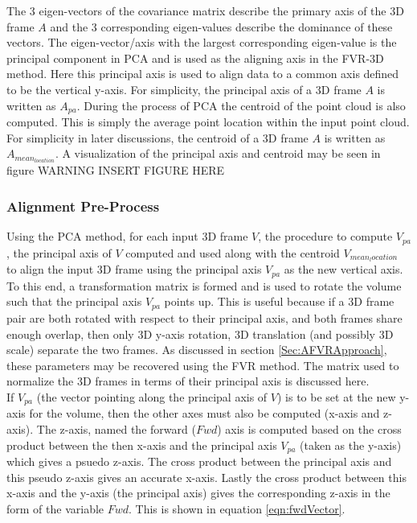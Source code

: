 The 3 eigen-vectors of the covariance matrix describe the primary axis of the 3D frame $A$ and the 3 corresponding eigen-values describe the dominance of these vectors. The eigen-vector/axis with the largest corresponding eigen-value is the principal component in PCA and is used as the aligning axis in the FVR-3D method. Here this principal axis is used to align data to a common axis defined to be the vertical y-axis. For simplicity, the principal axis of a 3D frame $A$ is written as $A_{pa}$. During the process of PCA the centroid of the point cloud is also computed. This is simply the average point location within the input point cloud. For simplicity in later discussions, the centroid of a 3D frame $A$ is written as $A_{mean_{location}}$. A visualization of the principal axis and centroid may be seen in figure WARNING INSERT FIGURE HERE \\

\subsubsection{Alignment Pre-Process}

Using the PCA method, for each input 3D frame $V$, the procedure to compute $V_{pa}$, the principal axis of $V$ computed and used along with the centroid $V_{mean_location}$ to align the input 3D frame using the principal axis $V_{pa}$ as the new vertical axis. To this end, a transformation matrix is formed and is used to rotate the volume such that the principal axis $V_{pa}$ points up. This is useful because if a 3D frame pair are both rotated with respect to their principal axis, and both frames share enough overlap, then only 3D y-axis rotation, 3D translation (and possibly 3D scale) separate the two frames. As discussed in section \ref{Sec:AFVRApproach}, these parameters may be recovered using the FVR method. The matrix used to normalize the 3D frames in terms of their principal axis is discussed here. \\

If $V_{pa}$ (the vector pointing along the principal axis of $V$) is to be set at the new y-axis for the volume, then the other axes must also be computed (x-axis and z-axis). The z-axis, named the forward ($Fwd$) axis is computed based on the cross product between the then x-axis and the principal axis $V_{pa}$ (taken as the y-axis) which gives a psuedo z-axis. The cross product between the principal axis and this pseudo z-axis gives an accurate x-axis. Lastly the cross product between this x-axis and the y-axis (the principal axis) gives the corresponding z-axis in the form of the variable $Fwd$. This is shown in equation \ref{eqn:fwdVector}. \\


